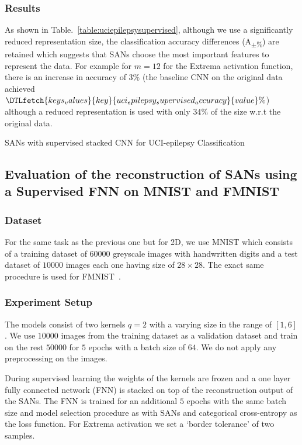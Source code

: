 \documentclass[journal]{IEEEtran}
\begin{document}
\subsubsection{Results}
As shown in Table.~\ref{table:uciepilepsysupervised}, although we use a significantly reduced representation size, the classification accuracy differences (A\textsubscript{$\pm$\%}) are retained which suggests that SANs choose the most important features to represent the data.
For example for $m=12$ for the Extrema activation function, there is an increase in accuracy of $3\%$ (the baseline CNN on the original data achieved $\DTLfetch{keys_values}{key}{uci_epilepsy_supervised_accuracy}{value}\%$) although a reduced representation is used with only $34\%$ of the size w.r.t the original data.

\begin{table*}[!t]
	\centering
	\caption{SANs with supervised stacked CNN for UCI-epilepsy Classification}
	\label{table:uciepilepsysupervised}
	\setlength\tabcolsep{3.8pt}
	
\end{table*}

\subsection{Evaluation of the reconstruction of SANs using a Supervised FNN on MNIST and FMNIST}
\subsubsection{Dataset}
For the same task as the previous one but for 2D, we use MNIST which consists of a training dataset of $60000$ greyscale images with handwritten digits and a test dataset of $10000$ images each one having size of $28\times 28$.
The exact same procedure is used for FMNIST~\cite{xiao2017fashion}.

\subsubsection{Experiment Setup}
The models consist of two kernels $q=2$ with a varying size in the range of $[1, 6]$.
We use $10000$ images from the training dataset as a validation dataset and train on the rest $50000$ for $5$ epochs with a batch size of $64$.
We do not apply any preprocessing on the images.

During supervised learning the weights of the kernels are frozen and a one layer fully connected network (FNN) is stacked on top of the reconstruction output of the SANs.
The FNN is trained for an additional $5$ epochs with the same batch size and model selection procedure as with SANs and categorical cross-entropy as the loss function.
For Extrema activation we set a `border tolerance' of two samples.
\end{document}
